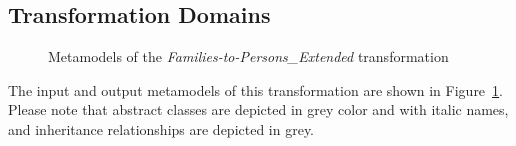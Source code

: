 \subsection{Transformation Domains}\label{sec:trans_domain}

\begin{figure}[bt]
\centering
{}
\caption{Metamodels of the \emph{Families-to-Persons\_Extended} transformation}\label{fig:metamodels}
\end{figure}

The input and output metamodels of this transformation are shown in Figure~\ref{fig:metamodels}. Please note that abstract classes are depicted in grey color and with italic names, and inheritance relationships are depicted in grey.

